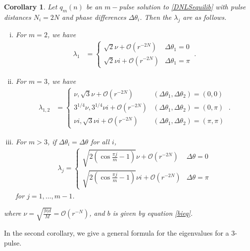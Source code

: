 \documentclass[12pt]{elsarticle}
\newtheorem{corollary}{Corollary}
\begin{document}
\begin{corollary}\label{DNLSeigcorr}Let $q_m(n)$ be an $m-$pulse solution to \cref{DNLSequilib} with pulse distances $N_i = 2N$ and phase differences $\Delta\theta_i$. Then the $\lambda_j$ are as follows.
\begin{enumerate}[(i)]
\item For $m = 2$, we have
\begin{align}\label{2pulseeigs}
\lambda_1 &= 
\begin{cases}
\sqrt{2}\nu  + \mathcal{O}(r^{-2N}) & \Delta\theta_1 = 0 \\
\sqrt{2}\nu i + \mathcal{O}(r^{-2N}) & \Delta\theta_1 = \pi
\end{cases} \:.
\end{align}
\item For $m = 3$, we have
\begin{align}\label{3pulseequaleigs}
\lambda_{1, 2} &= \begin{cases}
\nu, \sqrt{3} \nu + \mathcal{O}(r^{-2N}) & (\Delta\theta_1, \Delta\theta_2) = (0, 0) \\
3^{1/4}\nu, 3^{1/4}\nu i + \mathcal{O}(r^{-2N}) & (\Delta\theta_1, \Delta\theta_2) = (0, \pi) \\
\nu i, \sqrt{3} \nu i + \mathcal{O}(r^{-2N}) & (\Delta\theta_1, \Delta\theta_2) = (\pi, \pi)
\end{cases}\:.
\end{align}
\item For $m > 3$, if $\Delta\theta_i = \Delta\theta$ for all $i$,
\begin{align*}
\lambda_j = \begin{cases}
\sqrt{2\left( \cos\frac{\pi j}{m} - 1 \right)}\nu + \mathcal{O}(r^{-2N}) & \Delta\theta = 0 \\
\sqrt{2\left( \cos\frac{\pi j}{m} - 1 \right)}\nu i + \mathcal{O}(r^{-2N}) & \Delta\theta = \pi
\end{cases}
\end{align*}
for $j = 1, \dots, m-1$.
\end{enumerate}
where $\nu = \sqrt{\frac{|b|d}{M}} = \mathcal{O}(r^{-N})$, and $b$ is given by equation \cref{bieq}.
\end{corollary}

In the second corollary, we give a general formula for the eigenvalues for a 3-pulse.
\end{document}
